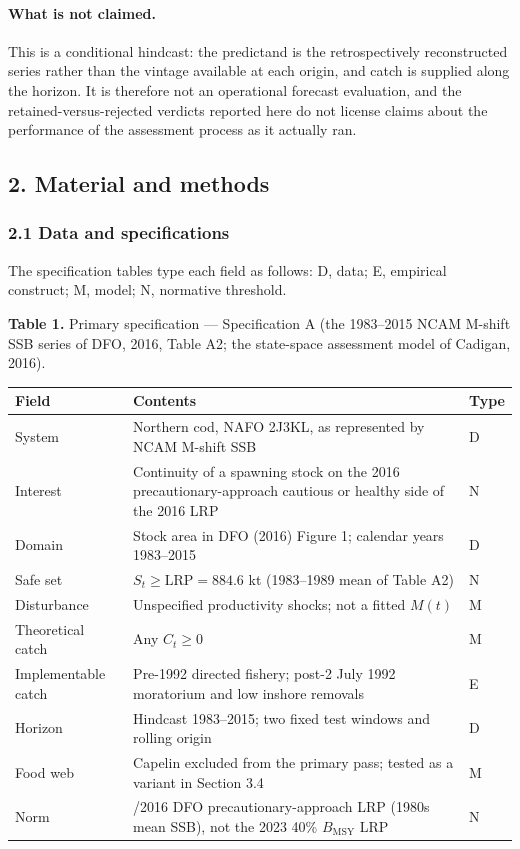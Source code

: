 \documentclass[11pt]{article}
\begin{document}
\paragraph{What is not claimed.} This is a conditional hindcast: the predictand is the
retrospectively reconstructed series rather than the vintage available at each origin, and
catch is supplied along the horizon. It is therefore not an operational forecast evaluation,
and the retained-versus-rejected verdicts reported here do not license claims about the
performance of the assessment process as it actually ran.

\subsection{2. Material and methods}\label{cod-material-and-methods}

\subsubsection{2.1 Data and
specifications}\label{cod-data-and-specifications}

The specification tables type each field as follows: D, data; E,
empirical construct; M, model; N, normative threshold.

\textbf{Table 1.} Primary specification --- Specification A (the
1983--2015 NCAM M-shift SSB series of DFO, 2016, Table A2; the
state-space assessment model of Cadigan, 2016).

\begin{longtable}[]{@{}
  >{\raggedright\arraybackslash}p{}
  >{\raggedright\arraybackslash}p{}
  >{\raggedright\arraybackslash}p{}@{}}
\toprule\noalign{}
Field & Contents & Type \\
\midrule\noalign{}
\endhead
\bottomrule\noalign{}
\endlastfoot
System & Northern cod, NAFO 2J3KL, as represented by NCAM M-shift SSB &
D \\
Interest & Continuity of a spawning stock on the 2016
precautionary-approach cautious or healthy side of the 2016 LRP & N \\
Domain & Stock area in DFO (2016) Figure 1; calendar years 1983--2015 &
D \\
Safe set & \(S_t \ge \mathrm{LRP} = 884.6\) kt (1983--1989 mean of Table
A2) & N \\
Disturbance & Unspecified productivity shocks; not a fitted \(M(t)\) &
M \\
Theoretical catch & Any \(C_t \ge 0\) & M \\
Implementable catch & Pre-1992 directed fishery; post-2 July 1992
moratorium and low inshore removals & E \\
Horizon & Hindcast 1983--2015; two fixed test windows and rolling origin
& D \\
Food web & Capelin excluded from the primary pass; tested as a variant
in Section 3.4 & M \\
Norm & 2010/2016 DFO precautionary-approach LRP (1980s mean SSB), not
the 2023 40\% \(B_{\mathrm{MSY}}\) LRP & N \\
\end{longtable}
\end{document}
